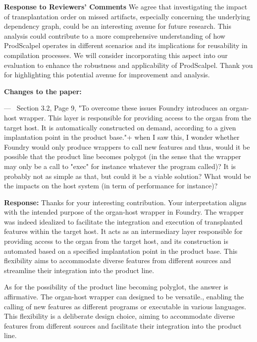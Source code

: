 \documentclass[a4paper,11pt]{letter}
\newcounter{reviewer}
\newcounter{point}[reviewer]
\renewcommand{\thepoint}{P\,\thereviewer.\arabic{point}}
\newenvironment{point}
   {\refstepcounter{point} \bigskip \noindent {\textbf{Reviewer~Point~\thepoint} } ---\ }
   {\par }
\newcommand{\response}[1]{\textbf{Response:} \begingroup\color{black}#1\endgroup}
\newcommand{\changes}[1]{\textbf{Changes to the paper:} \begingroup\color{blue}#1\endgroup}
\begin{document}
\begin{letter}{\textbf{Response to Reviewers' Comments}}
{We agree that investigating the impact of transplantation order on missed artifacts, especially concerning the underlying dependency graph, could be an interesting avenue for future research. This analysis could contribute to a more comprehensive understanding of how ProdScalpel operates in different scenarios and its implications for reusability in compilation processes. We will consider incorporating this aspect into our evaluation to enhance the robustness and applicability of ProdScalpel. Thank you for highlighting this potential avenue for improvement and analysis.}

\changes{}


\begin{point}
Section 3.2, Page 9, "To overcome these issues Foundry introduces an organ-host wrapper. This layer is responsible for providing access to the organ from the target host. It is automatically constructed on demand, according to a given implantation point in the product base."+
when I saw this, I wonder whether Foundry would only produce wrappers to call new features and thus, would it be possible that the product line becomes polygot (in the sense that the wrapper may only be a call to "exec" for instance whatever the program called)? 
It is probably not as simple as that, but could it be a viable solution? What would be the impacts on the host system (in term of performance for instance)?
	\label{pt:foo}
\end{point}

\response{Thanks for your interesting contribution. Your interpretation aligns with the intended purpose of the organ-host wrapper in Foundry. The wrapper was indeed idealized to facilitate the integration and execution of transplanted features within the target host. It acts as an intermediary layer responsible for providing access to the organ from the target host, and its construction is automated based on a specified implantation point in the product base. This flexibility aims to accommodate diverse features from different sources and streamline their integration into the product line.

As for the possibility of the product line becoming polyglot, the answer is affirmative. The organ-host wrapper can designed to be versatile., enabling the calling of new features as different programs or executable in various languages. This flexibility is a deliberate design choice, aiming to accommodate diverse features from different sources and facilitate their integration into the product line.

}
\end{letter}
\end{document}
